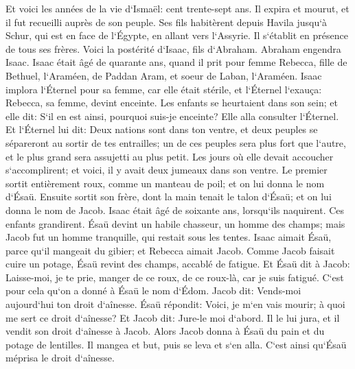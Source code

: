 \verse Et voici les années de la vie d`Ismaël: cent trente-sept ans. Il expira et mourut, et il fut recueilli auprès de son peuple. 
\verse Ses fils habitèrent depuis Havila jusqu`à Schur, qui est en face de l`Égypte, en allant vers l`Assyrie. Il s`établit en présence de tous ses frères. 
\verse Voici la postérité d`Isaac, fils d`Abraham. 
\verse Abraham engendra Isaac. Isaac était âgé de quarante ans, quand il prit pour femme Rebecca, fille de Bethuel, l`Araméen, de Paddan Aram, et soeur de Laban, l`Araméen. 
\verse Isaac implora l`Éternel pour sa femme, car elle était stérile, et l`Éternel l`exauça: Rebecca, sa femme, devint enceinte. 
\verse Les enfants se heurtaient dans son sein; et elle dit: S`il en est ainsi, pourquoi suis-je enceinte? Elle alla consulter l`Éternel. 
\verse Et l`Éternel lui dit: Deux nations sont dans ton ventre, et deux peuples se sépareront au sortir de tes entrailles; un de ces peuples sera plus fort que l`autre, et le plus grand sera assujetti au plus petit. 
\verse Les jours où elle devait accoucher s`accomplirent; et voici, il y avait deux jumeaux dans son ventre. 
\verse Le premier sortit entièrement roux, comme un manteau de poil; et on lui donna le nom d`Ésaü. 
\verse Ensuite sortit son frère, dont la main tenait le talon d`Ésaü; et on lui donna le nom de Jacob. Isaac était âgé de soixante ans, lorsqu`ils naquirent. 
\verse Ces enfants grandirent. Ésaü devint un habile chasseur, un homme des champs; mais Jacob fut un homme tranquille, qui restait sous les tentes. 
\verse Isaac aimait Ésaü, parce qu`il mangeait du gibier; et Rebecca aimait Jacob. 
\verse Comme Jacob faisait cuire un potage, Ésaü revint des champs, accablé de fatigue. 
\verse Et Ésaü dit à Jacob: Laisse-moi, je te prie, manger de ce roux, de ce roux-là, car je suis fatigué. C`est pour cela qu`on a donné à Ésaü le nom d`Édom. 
\verse Jacob dit: Vends-moi aujourd`hui ton droit d`aînesse. 
\verse Ésaü répondit: Voici, je m`en vais mourir; à quoi me sert ce droit d`aînesse? 
\verse Et Jacob dit: Jure-le moi d`abord. Il le lui jura, et il vendit son droit d`aînesse à Jacob. 
\verse Alors Jacob donna à Ésaü du pain et du potage de lentilles. Il mangea et but, puis se leva et s`en alla. C`est ainsi qu`Ésaü méprisa le droit d`aînesse. 


